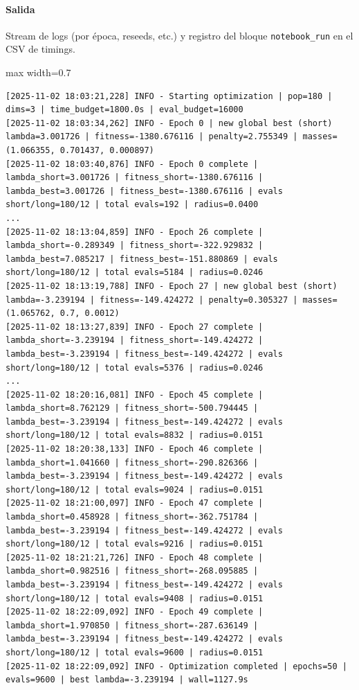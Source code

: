 \paragraph{Salida} Stream de logs (por época, reseeds, etc.) y registro del bloque \texttt{notebook\_run} en el CSV de timings.

\begin{listing}[H]
\caption{Ejemplo Salida}
\begin{adjustbox}{max width=0.7\textwidth}
\begin{minipage}{\textwidth}
\begin{verbatim}
[2025-11-02 18:03:21,228] INFO - Starting optimization | pop=180 | dims=3 | time_budget=1800.0s | eval_budget=16000
[2025-11-02 18:03:34,262] INFO - Epoch 0 | new global best (short) lambda=3.001726 | fitness=-1380.676116 | penalty=2.755349 | masses=(1.066355, 0.701437, 0.000897)
[2025-11-02 18:03:40,876] INFO - Epoch 0 complete | lambda_short=3.001726 | fitness_short=-1380.676116 | lambda_best=3.001726 | fitness_best=-1380.676116 | evals short/long=180/12 | total evals=192 | radius=0.0400
...
[2025-11-02 18:13:04,859] INFO - Epoch 26 complete | lambda_short=-0.289349 | fitness_short=-322.929832 | lambda_best=7.085217 | fitness_best=-151.880869 | evals short/long=180/12 | total evals=5184 | radius=0.0246
[2025-11-02 18:13:19,788] INFO - Epoch 27 | new global best (short) lambda=-3.239194 | fitness=-149.424272 | penalty=0.305327 | masses=(1.065762, 0.7, 0.0012)
[2025-11-02 18:13:27,839] INFO - Epoch 27 complete | lambda_short=-3.239194 | fitness_short=-149.424272 | lambda_best=-3.239194 | fitness_best=-149.424272 | evals short/long=180/12 | total evals=5376 | radius=0.0246
...
[2025-11-02 18:20:16,081] INFO - Epoch 45 complete | lambda_short=8.762129 | fitness_short=-500.794445 | lambda_best=-3.239194 | fitness_best=-149.424272 | evals short/long=180/12 | total evals=8832 | radius=0.0151
[2025-11-02 18:20:38,133] INFO - Epoch 46 complete | lambda_short=1.041660 | fitness_short=-290.826366 | lambda_best=-3.239194 | fitness_best=-149.424272 | evals short/long=180/12 | total evals=9024 | radius=0.0151
[2025-11-02 18:21:00,097] INFO - Epoch 47 complete | lambda_short=0.458928 | fitness_short=-362.751784 | lambda_best=-3.239194 | fitness_best=-149.424272 | evals short/long=180/12 | total evals=9216 | radius=0.0151
[2025-11-02 18:21:21,726] INFO - Epoch 48 complete | lambda_short=0.982516 | fitness_short=-268.095885 | lambda_best=-3.239194 | fitness_best=-149.424272 | evals short/long=180/12 | total evals=9408 | radius=0.0151
[2025-11-02 18:22:09,092] INFO - Epoch 49 complete | lambda_short=1.970850 | fitness_short=-287.636149 | lambda_best=-3.239194 | fitness_best=-149.424272 | evals short/long=180/12 | total evals=9600 | radius=0.0151
[2025-11-02 18:22:09,092] INFO - Optimization completed | epochs=50 | evals=9600 | best lambda=-3.239194 | wall=1127.9s
\end{verbatim}
\end{minipage}
\end{adjustbox}
\end{listing}

